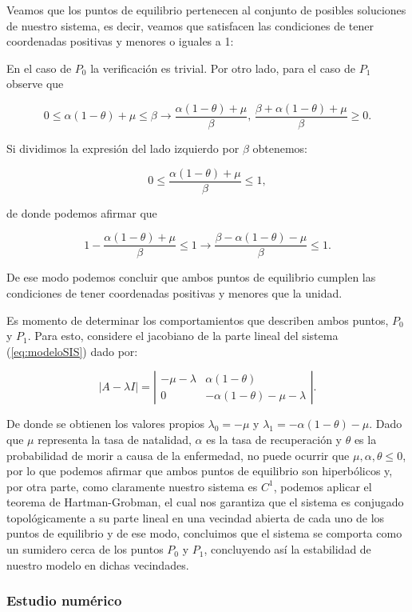 Veamos que los puntos de equilibrio pertenecen al conjunto de posibles soluciones de nuestro sistema, es decir, veamos que satisfacen las condiciones de tener coordenadas positivas y menores o iguales a 1:

En el caso de $P_0$ la verificación es trivial. Por otro lado, para el caso de $P_1$ observe que 

$$0\leq\alpha(1-\theta)+\mu\leq\beta \longrightarrow \frac{\alpha(1-\theta)+\mu}{\beta}\text{, }\frac{\beta+\alpha(1-\theta)+\mu}{\beta}\geq0.$$

Si dividimos la expresión del lado izquierdo por $\beta$ obtenemos:

$$0\leq \frac{\alpha(1-\theta)+\mu}{\beta}\leq1,$$

de donde podemos afirmar que 

$$1-\frac{\alpha(1-\theta)+\mu}{\beta}\leq1 \longrightarrow \frac{\beta-\alpha(1-\theta)-\mu}{\beta}\leq1.$$

De ese modo podemos concluir que ambos puntos de equilibrio cumplen las condiciones de tener coordenadas positivas y menores que la unidad.

Es momento de determinar los comportamientos que describen ambos puntos, $P_0$ y $P_1$. Para esto, considere el jacobiano de la parte lineal del sistema (\ref{eq:modeloSIS}) dado por:

$$|A-\lambda I|=
\left|\begin{array}{cc}
-\mu-\lambda & \alpha(1-\theta) \\
0 & -\alpha(1-\theta)-\mu-\lambda
\end{array}\right|.$$

De donde se obtienen los valores propios $\lambda_0 = -\mu$ y $\lambda_1 = -\alpha(1-\theta)-\mu$. Dado que $\mu$ representa la tasa de natalidad, $\alpha$ es la tasa de recuperación y $\theta$ es la probabilidad de morir a causa de la enfermedad, no puede ocurrir que $\mu,\alpha,\theta\leq0$, por lo que podemos afirmar que ambos puntos de equilibrio son hiperbólicos y, por otra parte, como claramente nuestro sistema es $C^1$, podemos aplicar el teorema de Hartman-Grobman, el cual nos garantiza que el sistema es conjugado topológicamente a su parte lineal en una vecindad abierta de cada uno de los puntos de equilibrio y de ese modo, concluimos que el sistema se comporta como un sumidero cerca de los puntos $P_0$ y $P_1$, concluyendo así la estabilidad de nuestro modelo en dichas vecindades.

\subsubsection{Estudio numérico}

